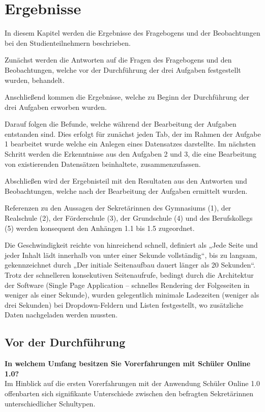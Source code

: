 \pagebreak
\section{Ergebnisse}

In diesem Kapitel werden die Ergebnisse des Fragebogens und der Beobachtungen bei den Studienteilnehmern beschrieben.

Zunächst werden die Antworten auf die Fragen des Fragebogens und den Beobachtungen, welche vor der Durchführung der drei Aufgaben festgestellt wurden, behandelt. 

Anschließend kommen die Ergebnisse, welche zu Beginn der Durchführung der drei Aufgaben erworben wurden.

Darauf folgen die Befunde, welche während der Bearbeitung der Aufgaben entstanden sind. Dies erfolgt für zunächst jeden Tab, der im Rahmen der Aufgabe 1 bearbeitet wurde welche ein Anlegen eines Datensatzes darstellte. Im nächsten Schritt werden die Erkenntnisse aus den Aufgaben 2 und 3, die eine Bearbeitung von existierenden Datensätzen beinhaltete, zusammenzufassen.

Abschließen wird der Ergebnisteil mit den Resultaten aus den Antworten und Beobachtungen, welche nach der Bearbeitung der Aufgaben ermittelt wurden.

Referenzen zu den Aussagen der Sekretärinnen des Gymnasiums (1), der Realschule (2), der Förderschule (3), der Grundschule (4) und des Berufskollegs (5) werden konsequent den Anhängen 1.1 bis 1.5 zugeordnet.

Die Geschwindigkeit reichte von hinreichend schnell, definiert als „Jede Seite und jeder Inhalt lädt innerhalb von unter einer Sekunde vollständig“, bis zu langsam, gekennzeichnet durch „Der initiale Seitenaufbau dauert länger als 20 Sekunden“. Trotz der schnelleren konsekutiven Seitenaufrufe, bedingt durch die Architektur der Software (Single Page Application – schnelles Rendering der Folgeseiten in weniger als einer Sekunde), wurden gelegentlich minimale Ladezeiten (weniger als drei Sekunden) bei Dropdown-Feldern und Listen festgestellt, wo zusätzliche Daten nachgeladen werden mussten.

\subsection{Vor der Durchführung}
\textbf{In welchem Umfang besitzen Sie Vorerfahrungen mit Schüler Online 1.0?}\\
Im Hinblick auf die ersten Vorerfahrungen mit der Anwendung Schüler Online 1.0 offenbarten sich signifikante Unterschiede zwischen den befragten Sekretärinnen unterschiedlicher Schultypen.

